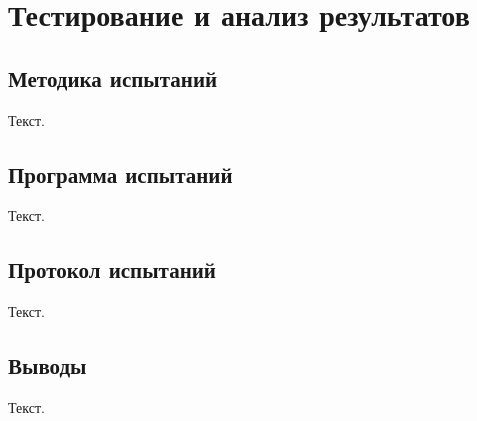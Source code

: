 \chapter{Тестирование и анализ результатов}

\section{Методика испытаний}

Текст.

\section{Программа испытаний}

Текст.

\section{Протокол испытаний}

Текст.

\section{Выводы}

Текст.

